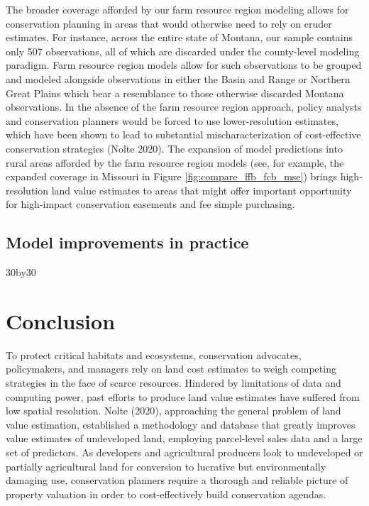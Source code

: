 \documentclass[12pt]{article}
\begin{document}
The broader coverage afforded by our farm resource region modeling allows for conservation planning in areas that would otherwise need to rely on cruder estimates. For instance, across the entire state of Montana, our sample contains only 507 observations, all of which are discarded under the county-level modeling paradigm. Farm resource region models allow for such observations to be grouped and modeled alongside observations in either the Basin and Range or Northern Great Plains which bear a resemblance to those otherwise discarded Montana observations. In the absence of the farm resource region approach, policy analysts and conservation planners would be forced to use lower-resolution estimates, which have been shown to lead to substantial mischaracterization of cost-effective conservation strategies (Nolte 2020). The expansion of model predictions into rural areas afforded by the farm resource region models (see, for example, the expanded coverage in Missouri in Figure \ref{fig:compare_ffb_fcb_mse}) brings high-resolution land value estimates to areas that might offer important opportunity for high-impact conservation easements and fee simple purchasing.

\subsection{Model improvements in practice} 

30by30

\section{Conclusion}

To protect critical habitats and ecosystems, conservation advocates, policymakers, and managers rely on land cost estimates to weigh competing strategies in the face of scarce resources. Hindered by limitations of data and computing power, past efforts to produce land value estimates have suffered from low spatial resolution. Nolte (2020), approaching the general problem of land value estimation, established a methodology and database that greatly improves value estimates of undeveloped land, employing parcel-level sales data and a large set of predictors. As developers and agricultural producers look to undeveloped or partially agricultural land for conversion to lucrative but environmentally damaging use, conservation planners require a thorough and reliable picture of property valuation in order to cost-effectively build conservation agendas.
\end{document}

